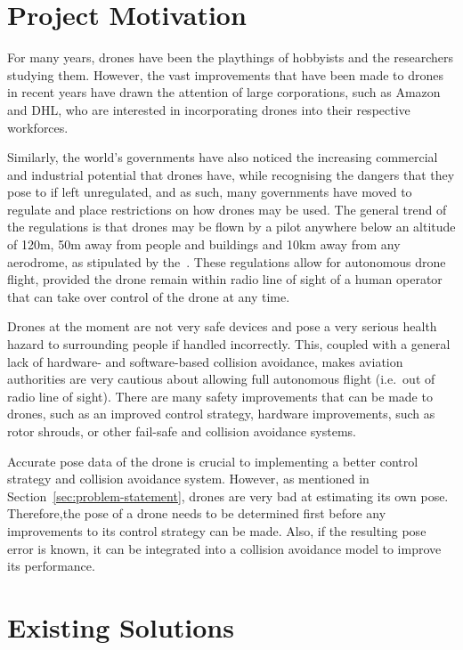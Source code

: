 \section{Project Motivation}

For many years, drones have been the playthings of hobbyists and the researchers studying them. However, the vast improvements that have been made to drones in recent years have drawn the attention of large corporations, such as Amazon and DHL, who are interested in incorporating drones into their respective workforces. 

Similarly, the world's governments have also noticed the increasing commercial and industrial potential that drones have, while recognising the dangers that they pose to if left unregulated, and as such, many governments have moved to regulate and place restrictions on how drones may be used. The general trend of the regulations is that drones may be flown by a pilot anywhere below an altitude of 120m, 50m away from people and buildings and 10km away from any aerodrome, as stipulated by the~\cite{sacaa-drone-regs}. These regulations allow for autonomous drone flight, provided the drone remain within radio line of sight of a human operator that can take over control of the drone at any time. 

Drones at the moment are not very safe devices and pose a very serious health hazard to surrounding people if handled incorrectly. This, coupled with a general lack of hardware- and software-based collision avoidance, makes aviation authorities are very cautious about allowing full autonomous flight (i.e.\ out of radio line of sight). There are many safety improvements that can be made to drones, such as an improved control strategy, hardware improvements, such as rotor shrouds, or other fail-safe and collision avoidance systems. 

Accurate pose data of the drone is crucial to implementing a better control strategy and collision avoidance system. However, as mentioned in Section~\ref{sec:problem-statement}, drones are very bad at estimating its own pose. Therefore,the pose of a drone needs to be determined first before any improvements to its control strategy can be made. Also, if the resulting pose error is known, it can be integrated into a collision avoidance model to improve its performance. 

\section{Existing Solutions}


